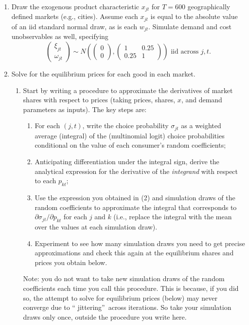 \documentclass[english,11pt]{article}
\begin{document}
\begin{enumerate}
\item Draw the exogenous product characteristic $x_{jt}$ for $T=600$
geographically defined markets (e.g., cities). Assume each $x_{jt}$ is equal
to the absolute value of an iid standard normal draw, as is each $w_{jt}$.
Simulate demand and cost unobservables as well, specifying
\begin{equation*}
\left(
\begin{array}{c}
\xi _{jt} \\
\omega _{jt}%
\end{array}%
\right) \sim N\left( \left(
\begin{array}{c}
0 \\
0%
\end{array}%
\right) ,\left(
\begin{array}{cc}
1 & 0.25 \\
0.25 & 1%
\end{array}%
\right) \right) \text{ iid across }j,t.
\end{equation*}

\item Solve for the equilibrium prices for each good in each market.

\begin{enumerate}
\item Start by writing a procedure to approximate the derivatives of market
shares with respect to prices (taking prices, shares, $x$, and demand
parameters as inputs). The key steps are:
\begin{enumerate}
\item For each $(j,t)$, write the choice probability $\sigma_{jt}$ as a weighted
average (integral) of the (multinomial logit) choice probabilities
conditional on the value of each consumer's random coefficients;
\item Anticipating differentiation under the integral sign, derive the
analytical expression for the derivative of the \textit{integrand} with
respect to each $p_{kt}$; 
\item Use the expression you obtained in (2) and simulation draws of the
random coefficients to approximate the integral that corresponds to $%
\partial \sigma_{jt}/\partial p_{kt}$ for each $j$ and $k$ (i.e., replace
the integral with the mean over the values at each simulation draw).
\item Experiment to see how many simulation draws you need to get precise
approximations and check this again at the equilibrium shares and prices you
obtain below. \newline
\end{enumerate}
Note: you do not want to take new simulation draws of the random
coefficients each time you call this procedure. This is because,  if you did so, the attempt
to solve for equilibrium prices (below) may never converge due to \textquotedblleft
jittering\textquotedblright\ across iterations. So take your simulation draws only once, outside the procedure you write here. %



\end{enumerate}
\end{enumerate}
\end{document}
